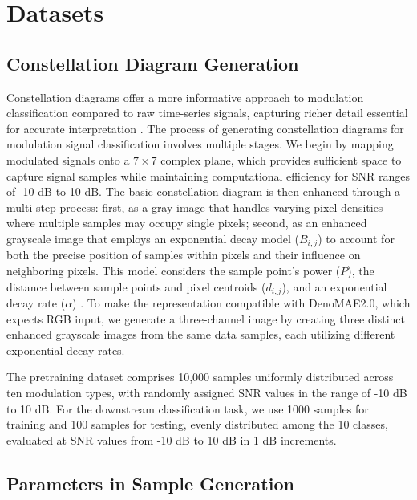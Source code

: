 \section{Datasets}

\subsection{Constellation Diagram Generation}

Constellation diagrams offer a more informative approach to modulation classification compared to raw time-series signals, capturing richer detail essential for accurate interpretation \cite{doan2020learning}. The process of generating constellation diagrams for modulation signal classification involves multiple stages. We begin by mapping modulated signals onto a $7 \times 7$ complex plane, which provides sufficient space to capture signal samples while maintaining computational efficiency for SNR ranges of -10 dB to 10 dB. The basic constellation diagram is then enhanced through a multi-step process: first, as a gray image that handles varying pixel densities where multiple samples may occupy single pixels; second, as an enhanced grayscale image that employs an exponential decay model ($B_{i,j}$) to account for both the precise position of samples within pixels and their influence on neighboring pixels. This model considers the sample point's power ($P$), the distance between sample points and pixel centroids ($d_{i,j}$), and an exponential decay rate ($\alpha$) \cite{peng2018modulation}. To make the representation compatible with DenoMAE2.0, which expects RGB input, we generate a three-channel image by creating three distinct enhanced grayscale images from the same data samples, each utilizing different exponential decay rates. 

The pretraining dataset comprises 10,000 samples uniformly distributed across ten modulation types, with randomly assigned SNR values in the range of -10 dB to 10 dB. For the downstream classification task, we use 1000 samples for training and 100 samples for testing, evenly distributed among the 10 classes, evaluated at SNR values from -10 dB to 10 dB in 1 dB increments.

\subsection{Parameters in Sample Generation} %

